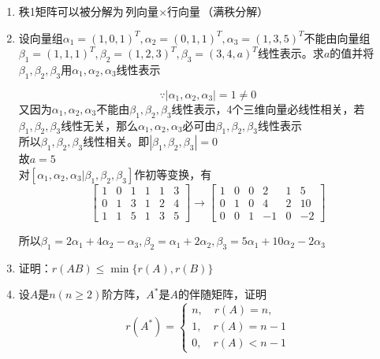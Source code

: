 \documentclass[./linear_algebra.tex]{subfiles}
\begin{document}
    \begin{enumerate}
        \item 秩1矩阵可以被分解为$\textbf{列向量}\times \textbf{行向量}$（满秩分解）
        \item 设向量组$\alpha_1 = (1,0,1)^T, \alpha_2 = (0,1,1)^T, \alpha_3 = (1,3,5)^T$不能由向量组$\beta_1 = (1,1,1)^T, \beta_2 = (1,2,3)^T, \beta_3 = (3,4,a)^T$线性表示。求$a$的值并将$\beta_1, \beta_2, \beta_3$用$\alpha_1, \alpha_2, \alpha_3$线性表示
        \begin{analysisbox}
            \[
                \because |\alpha_1, \alpha_2, \alpha_3| = 1 \neq 0
            \]
            又因为$\alpha_1, \alpha_2, \alpha_3$不能由$\beta_1, \beta_2, \beta_3$线性表示，4个三维向量必线性相关，若$\beta_1, \beta_2, \beta_3$线性无关，那么$\alpha_1, \alpha_2, \alpha_3$必可由$\beta_1, \beta_2, \beta_3$线性表示 \\
            所以$\beta_1, \beta_2, \beta_3$线性相关。即$|\beta_1, \beta_2, \beta_3| = 0$ \\
            故$a = 5$ \\
            对$[\alpha_1, \alpha_2, \alpha_3 | \beta_1, \beta_2, \beta_3]$作初等变换，有
            \[
                \left[
                    \begin{array}{ccc|ccc}
                        1 & 0 & 1 & 1 & 1 & 3 \\
                        0 & 1 & 3 & 1 & 2 & 4 \\
                        1 & 1 & 5 & 1 & 3 & 5
                    \end{array}\right] \rightarrow \left[\begin{array}{ccc|ccc}
                                                             1 & 0 & 0 & 2  & 1 & 5  \\
                                                             0 & 1 & 0 & 4  & 2 & 10 \\
                                                             0 & 0 & 1 & -1 & 0 & -2
                \end{array}\right]
            \]

            所以$\beta_1 = 2\alpha_1 + 4\alpha_2 - \alpha_3, \beta_2 = \alpha_1 + 2\alpha_2, \beta_3 = 5\alpha_1 + 10\alpha_2 - 2\alpha_3$
        \end{analysisbox}
        \item 证明：$r(AB) \le \min\{r(A), r(B)\}$
        \begin{analysisbox}

        \end{analysisbox}
        \item 设$A$是$n(n \geq 2)$阶方阵，$A^*$是$A$的伴随矩阵，证明
        \[
            r(A^*) = \begin{cases}
                         n, \quad r(A) = n, \\
                         1, \quad r(A) = n - 1 \\
                         0, \quad r(A) < n - 1
            \end{cases}
        \]
        \begin{analysisbox}


\end{analysisbox}
\end{enumerate}
\end{document}
